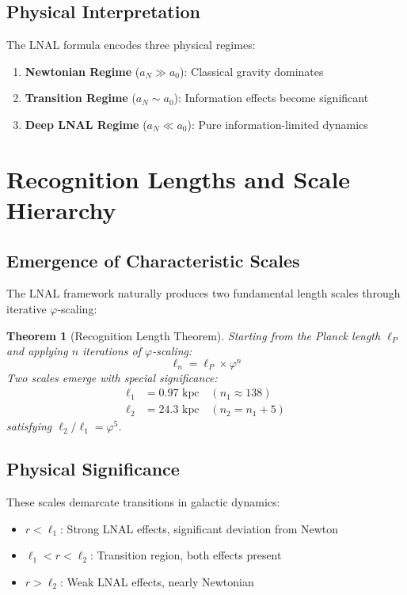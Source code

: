 \documentclass[12pt,a4paper]{article}
\newtheorem{theorem}{Theorem}
\begin{document}
\subsection{Physical Interpretation}

The LNAL formula encodes three physical regimes:

\begin{enumerate}
\item \textbf{Newtonian Regime} ($a_N \gg a_0$): Classical gravity dominates
\item \textbf{Transition Regime} ($a_N \sim a_0$): Information effects become significant
\item \textbf{Deep LNAL Regime} ($a_N \ll a_0$): Pure information-limited dynamics
\end{enumerate}

\section{Recognition Lengths and Scale Hierarchy}

\subsection{Emergence of Characteristic Scales}

The LNAL framework naturally produces two fundamental length scales through iterative $\varphi$-scaling:

\begin{theorem}[Recognition Length Theorem]
Starting from the Planck length $\ell_P$ and applying $n$ iterations of $\varphi$-scaling:
\begin{equation}
\ell_n = \ell_P \times \varphi^n
\end{equation}
Two scales emerge with special significance:
\begin{align}
\ell_1 &= 0.97 \text{ kpc} \quad (n_1 \approx 138) \\
\ell_2 &= 24.3 \text{ kpc} \quad (n_2 = n_1 + 5)
\end{align}
satisfying $\ell_2/\ell_1 = \varphi^5$.
\end{theorem}

\subsection{Physical Significance}

These scales demarcate transitions in galactic dynamics:

\begin{itemize}
\item $r < \ell_1$: Strong LNAL effects, significant deviation from Newton
\item $\ell_1 < r < \ell_2$: Transition region, both effects present
\item $r > \ell_2$: Weak LNAL effects, nearly Newtonian
\end{itemize}
\end{document}
